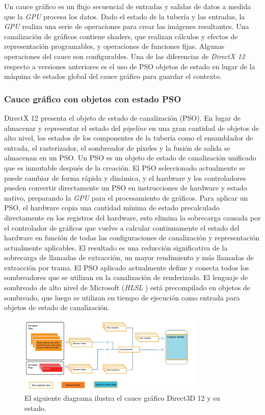 \documentclass[a4paper]{book}
\begin{document}
Un cauce gráfico es un flujo secuencial de entradas y salidas de datos a medida que la \textit{GPU} procesa los datos.
Dado el estado de la tubería y las entradas, la \textit{GPU} realiza una serie de operaciones para crear las imágenes resultantes.
Una canalización de gráficos contiene shaders, que realizan cálculos y efectos de representación programables, y operaciones
de funciones fijas. Algunas operaciones del cauce son configurables. Una de las diferencias de \textit{DirectX 12} respecto a
versiones anteriores es el uso de PSO objetos de estado en lugar de la máquina de estados global del cauce gráfico para guardar el contexto.

\subsubsection{Cauce gráfico con objetos con estado PSO}
\label{subsubsec:PSO}

DirectX 12 presenta el objeto de estado de canalización (PSO). En lugar de almacenar y representar el estado del \textit{pipeline}
en una gran cantidad de objetos de alto nivel, los estados de los componentes de la tubería como el ensamblador de entrada,
el rasterizador, el sombreador de píxeles y la fusión de salida se almacenan en un PSO. Un PSO es un objeto de estado de
canalización unificado que es inmutable después de la creación. El PSO seleccionado actualmente se puede cambiar de forma rápida
y dinámica, y el hardware y los controladores pueden convertir directamente un PSO en instrucciones de hardware y estado nativo,
preparando la \textit{GPU} para el procesamiento de gráficos. Para aplicar un PSO, el hardware copia una cantidad mínima de estado
precalculado directamente en los registros del hardware, esto elimina la sobrecarga causada por el controlador de gráficos que vuelve a calcular
continuamente el estado del hardware en función de todas las configuraciones de canalización y representación actualmente
aplicables. El resultado es una reducción significativa de la sobrecarga de llamadas de extracción, un mayor rendimiento
y más llamadas de extracción por trama. El PSO aplicado actualmente define y conecta todos los sombreadores que se utilizan en la
canalización de renderizado. El lenguaje de sombreado de alto nivel de Microsoft (\textit{HLSL} ) está precompilado en objetos de
sombreado, que luego se utilizan en tiempo de ejecución como entrada para objetos de estado de canalización. \cite{book:_directX}

\begin{figure}[H]
    \centering
    \includegraphics[width=9cm, keepaspectratio]{img/compute-pipeline.png}
    \caption{El siguiente diagrama ilustra el cauce gráfico Direct3D 12 y su estado.}
    \label{compute}
\end{figure}
\end{document}
